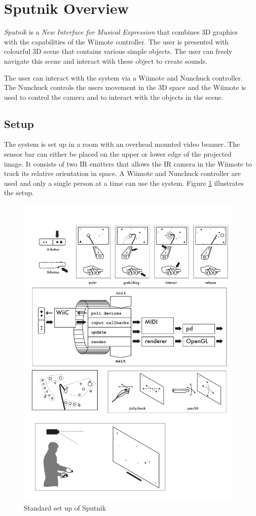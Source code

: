 \documentclass[10pt,a4paper]{scrartcl}
\begin{document}
\section{Sputnik Overview}

\emph{Sputnik} is a \emph{New Interface for Musical Expression} that combines 3D graphics with the capabilities of the Wiimote controller. The user is presented with colourful 3D scene that contains various simple objects. The user can freely navigate this scene and interact with these object to create sounds.

The user can interact with the system via a Wiimote and Nunchuck controller. The Nunchuck controls the users movement in the 3D space and the Wiimote is used to control the camera and to interact with the objects in the scene. 

\subsection{Setup}
The system is set up in a room with an overhead mounted video beamer. The sensor bar can either be placed on the upper or lower edge of the projected image. It consists of two IR emitters that allows the IR camera in the Wiimote to track its relative orientation in space. A Wiimote and Nunchuck controller are used and only a single person at a time can use the system. Figure \ref{fig:sputnik-setup} illustrates the setup.

\begin{figure}[hbtp]
\begin{center}
\includegraphics[width=0.4\columnwidth]{img/setup}
\caption{Standard set up of Sputnik}
\label{fig:sputnik-setup}
\end{center}
\end{figure}
\end{document}
